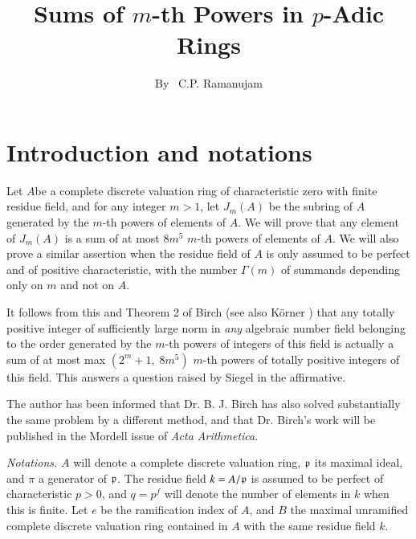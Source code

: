 \title{Sums of $m$-th Powers in $p$-Adic Rings}\label{art5}

\author{By~ C.P. Ramanujam}

\date{}
\maketitle

\setcounter{page}{59}

\setcounter{section}{-1}
\section{Introduction and notations}\label{art5-sec0}
\setcounter{pageoriginal}{44}
Let $A$\pageoriginale be a complete discrete valuation ring of characteristic zero with finite residue field, and for any integer $m>1$, let $J_m(A)$ be the subring of $A$ generated by the $m$-th powers of elements of $A$. We will prove that any element of $J_m (A)$ is a sum of at most $8m^5$ $m$-th powers of elements of $A$. We will also prove a similar assertion when the residue field of $A$ is only assumed to be perfect and of positive characteristic, with the number $\Gamma (m)$ of summands depending only on $m$ and not on $A$.

It follows from this and Theorem 2 of Birch \cite{art5-key1} (see also K\"orner \cite{art5-key2}) that any totally positive integer of sufficiently large norm in {\em any} algebraic number field belonging to the order generated by the $m$-th powers of integers of this field is actually a sum of at most max $(2^m + 1, \; 8 m^5)$ $m$-th powers of totally positive integers of this field. This answers a question raised by Siegel \cite{art5-key3} in the affirmative.

The author has been informed that Dr. B. J. Birch has also solved substantially the same problem by a different method, and that Dr. Birch's work will be published in the Mordell issue of {\em Acta Arithmetica}.

{\em Notations.} $A$ will denote a complete discrete valuation ring, $\mathfrak{p}$ its maximal ideal, and $\pi$ a generator of  $\mathfrak{p}$. The residue field $k = A/\mathfrak{p}$ is assumed to be perfect of characteristic $p>0$, and $q = p^f$ will denote the number of elements in $k$ when this is finite. Let $e$ be the ramification index of $A$, and $B$ the maximal unramified complete discrete valuation ring contained in $A$ with the same residue field $k$.

